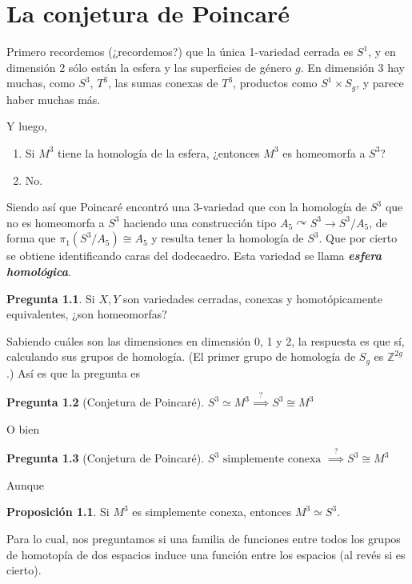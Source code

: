 \documentclass[spanish]{book}
\theoremstyle{definition}
\newtheorem*{prop}{Proposición}
\newtheorem*{pregunta}{Pregunta}
\newcommand{\Z}{\mathbb{Z}}
\begin{document}
\chapter{La conjetura de Poincaré}
Primero recordemos (¿recordemos?) que la única 1-variedad cerrada es $S^1$, y en dimensión 2 sólo están la esfera y las superficies de género $g$. En dimensión 3 hay muchas, como $S^3$, $T^3$, las sumas conexas de $T^3$, productos como $S^1\times S_g$, y parece haber muchas más.

Y luego,
\begin{enumerate}
	\item[(Poincaré) ---] Si $M^3$ tiene la homología de la esfera, ¿entonces $M^3$ es homeomorfa a $S^3$?
	
	\item[(Poincaré) ---]  No.
\end{enumerate}

Siendo así que Poincaré encontró una 3-variedad que con la homología de $S^3$ que no es homeomorfa a $S^3$ haciendo una construcción tipo $A_5\curvearrowright S^3\to S^3/A_5$, de forma que $\pi_1(S^3/A_5)\cong A_5$ y resulta tener la homología de $S^3$. Que por cierto se obtiene identificando caras del dodecaedro. Esta variedad se llama \textbf{\textit{esfera homológica}}.

\begin{pregunta}
	Si $X,Y$ son variedades cerradas, conexas y homotópicamente equivalentes, ¿son homeomorfas?
\end{pregunta}

Sabiendo cuáles son las dimensiones en dimensión 0, 1 y 2, la respuesta es que sí, calculando sus grupos de homología. (El primer grupo de homología de $S_g$ es $\Z^{2g}$.) Así es que la pregunta es
\begin{pregunta}[Conjetura de Poincaré]
	$S^3\simeq M^3\overset{?}{\implies}S^3\cong M^3$
\end{pregunta}

O bien
\begin{pregunta}[Conjetura de Poincaré]
	$S^3\text{ simplemente conexa }\overset{?}{\implies}S^3\cong M^3$
\end{pregunta}

Aunque
\begin{prop}
	Si $M^3$ es simplemente conexa, entonces $M^3\simeq S^3$.
\end{prop}

Para lo cual, nos preguntamos si una familia de funciones entre todos los grupos de homotopía de dos espacios induce una función entre los espacios (al revés si es cierto).
\end{document}
